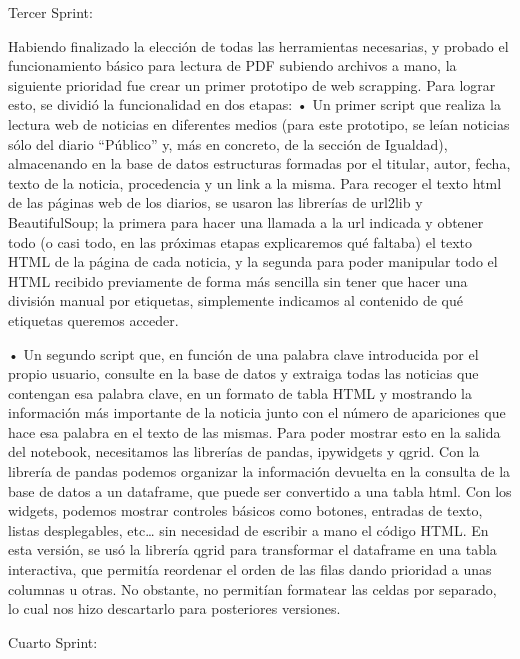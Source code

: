 Tercer Sprint:

Habiendo finalizado la elección de todas las herramientas necesarias, y probado el funcionamiento básico para lectura de PDF subiendo archivos a mano, la siguiente prioridad fue crear un primer prototipo de web scrapping.
Para lograr esto, se dividió la funcionalidad en dos etapas:
•	Un primer script que realiza la lectura web de noticias en diferentes medios (para este prototipo, se leían noticias sólo del diario “Público” y, más en concreto, de la sección de Igualdad), almacenando en la base de datos estructuras formadas por el titular, autor, fecha, texto de la noticia, procedencia y un link a la misma.
Para recoger el texto html de las páginas web de los diarios, se usaron las librerías de url2lib y BeautifulSoup; la primera para hacer una llamada a la url indicada y obtener todo (o casi todo, en las próximas etapas explicaremos qué faltaba) el texto HTML de la página de cada noticia, y la segunda para poder manipular todo el HTML recibido previamente de forma más sencilla sin tener que hacer una división manual por etiquetas, simplemente indicamos al contenido de qué etiquetas queremos acceder.
 
•	Un segundo script que, en función de una palabra clave introducida por el propio usuario, consulte en la base de datos y extraiga todas las noticias que contengan esa palabra clave, en un formato de tabla HTML y mostrando la información más importante de la noticia junto con el número de apariciones que hace esa palabra en el texto de las mismas.
Para poder mostrar esto en la salida del notebook, necesitamos las librerías de pandas, ipywidgets y qgrid. Con la librería de pandas podemos organizar la información devuelta en la consulta de la base de datos a un dataframe, que puede ser convertido a una tabla html. Con los widgets, podemos mostrar controles básicos como botones, entradas de texto, listas desplegables, etc… sin necesidad de escribir a mano el código HTML. En esta versión, se usó la librería qgrid para transformar el dataframe en una tabla interactiva, que permitía reordenar el orden de las filas dando prioridad a unas columnas u otras. No obstante, no permitían formatear las celdas por separado, lo cual nos hizo descartarlo para posteriores versiones.

Cuarto Sprint:

